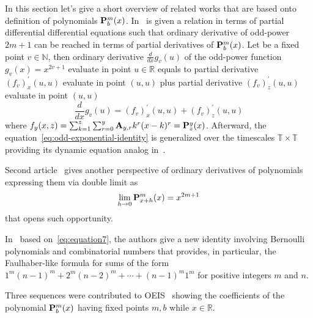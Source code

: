 In this section let's give a short overview of related works that are based onto definition
of polynomials ${\mathbf{P}}\sp{m} \sb{b}(x)$.
In~\cite{kolosov2023another} is given a relation in terms of partial differential differential equations such that
ordinary derivative of odd-power $2m+1$ can be reached in terms of partial derivatives of ${\mathbf{P}}\sp{m} \sb{b}(x)$.
Let be a fixed point $v\in \mathbb{N}$, then ordinary derivative $\frac{d}{dx} g_v (u)$ of the odd-power function $g_v(x) = x^{2v + 1}$
evaluate in point $u\in\mathbb{R}$ equals to partial derivative $(f_{v})^{'}_{x} (u, u)$ evaluate in point $(u, u)$ plus
partial derivative $(f_{v})^{'}_{z} (u, u)$ evaluate in point $(u, u)$
\begin{equation}
    \frac{d}{dx} g_v (u) = (f_{v})^{'}_{x} (u, u) + (f_{v})^{'}_{z} (u, u)
    \label{eq:odd-exponential-identity}
\end{equation}
where $f_{y} (x, z) = \sum_{k=1}^{z} \sum_{r=0}^{y} {\mathbf{A}} \sb{y,r} k^r (x-k)^r = {\mathbf{P}}\sp{y} \sb{z}(x)$.
Afterward, the equation~\eqref{eq:odd-exponential-identity}
is generalized over the timescales $\mathbb{T} \times \mathbb{T}$ providing its dynamic equation analog
in~\cite{kolosov2016study}.

Second article~\cite{kolosov_2024_10575485} gives another perspective of ordinary derivatives of polynomials expressing
them via double limit as
\[
    \lim_{h \to 0} {\mathbf{P}}\sp{m} \sb{x+h}(x) = x^{2m+1}
\]
that opens such opportunity.

In~\cite{barbero2020two} based on~\eqref{eq:equation7}, the authors give a new identity involving
Bernoulli polynomials and combinatorial numbers that provides,
in particular, the Faulhaber-like formula for sums of the form $1^m(n-1)^m + 2^m (n -2)^m + \cdots + (n - 1)^m 1^m$ for
positive integers $m$ and $n$.

Three sequences were contributed to
OEIS~\cite{kolosov2018coefficientspolynomial1, kolosov2018coefficientspolynomial2, kolosov2018coefficientspolynomial3}
showing the coefficients of the polynomial ${\mathbf{P}}\sp{m} \sb{b}(x)$ having fixed points $m,b$ while $x\in\mathbb{R}$.
